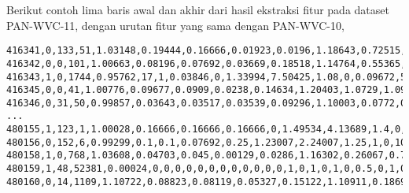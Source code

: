Berikut contoh lima baris awal dan akhir dari hasil ekstraksi fitur pada
dataset PAN-WVC-11, dengan urutan fitur yang sama dengan PAN-WVC-10,

\begin{lstlisting}[style=data,basicstyle=\footnotesize\ttfamily]
416341,0,133,51,1.03148,0.19444,0.16666,0.01923,0.0196,1.18643,0.72515,1.05882,0,0.21505,8,0,0,0.5,0.18181,0.4923,0,0.5,0,0.5,0,0.5,0,0.49275,0
416342,0,0,101,1.00663,0.08196,0.07692,0.03669,0.18518,1.14764,0.55365,0.9537,3,0.12137,11,2,0.05882,0.5,0.47058,0.5,0,0.5,0,0.5,0,0.5,0,0.5,0
416343,1,0,1744,0.95762,17,1,0.03846,0,1.33994,7.50425,1.08,0,0.09672,5,0,0,0.50299,0,0.51133,0.5,0.49777,0,0.5,0,0.51029,0.5,0.51047,1
416345,0,0,41,1.00776,0.09677,0.0909,0.0238,0.14634,1.20403,1.0729,1.09756,2,0.04375,13,2,0.2,0.5,0.4,0.5,0,0.5,0,0.5,0,0.5,0,0.5,0
416346,0,31,50,0.99857,0.03643,0.03517,0.03539,0.09296,1.10003,0.0772,0.66356,49,0.43945,13,2,0.00357,0.5,0.41785,0.50261,0.01071,0.52631,0,0.5,0,0.5,0.00714,0.50279,0
...
480155,1,123,1,1.00028,0.16666,0.16666,0.16666,0,1.49534,4.13689,1.4,0,0,5,2,0,0.5,1,0.49886,0,0.5,0,0.5,0,0.5,0,0.49896,0
480156,0,152,6,0.99299,0.1,0.1,0.07692,0.25,1.23007,2.24007,1.25,1,0,10,2,0,0.5,0,0.5,0,0.5,0,0.5,0,0.5,0,0.5,0
480158,1,0,768,1.03608,0.04703,0.045,0.00129,0.0286,1.16302,0.26067,0.71521,0,0.34586,12,2,0.02083,0.46938,0.41666,0.4744,0.01388,0.47058,0,0.5,0,0.46902,0.04861,0.47368,1
480159,1,48,52381,0.00024,0,0,0,0,0,0,0,0,0,0,0,0,1,0,1,0,1,0,0.5,0,1,0,1,1
480160,0,14,1109,1.10722,0.08823,0.08119,0.05327,0.15122,1.10911,0.18691,0.64685,71,0.29261,32,3,0.03539,0.48437,0.50442,0.47991,0,0.5,0,0.5,0,0.48965,0,0.48135,0
\end{lstlisting}
